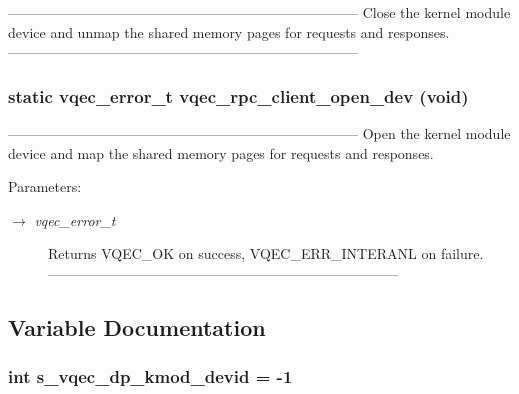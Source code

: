 --------------------------------------------------------------------------- Close the kernel module device and unmap the shared memory pages for requests and responses. --------------------------------------------------------------------------- 
\subsubsection{\setlength{\rightskip}{0pt plus 5cm}static vqec\_\-error\_\-t vqec\_\-rpc\_\-client\_\-open\_\-dev (void)\hspace{0.3cm}{\tt  [static]}}\label{vqec__rpc__client_8c_f24d2a8ab8e546935ab8c771964372e9}


--------------------------------------------------------------------------- Open the kernel module device and map the shared memory pages for requests and responses.

\begin{Desc}
\item[Parameters:]
\begin{description}
\item[\mbox{$\rightarrow$} {\em vqec\_\-error\_\-t}]Returns VQEC\_\-OK on success, VQEC\_\-ERR\_\-INTERANL on failure. --------------------------------------------------------------------------- \end{description}
\end{Desc}


\subsection{Variable Documentation}
\subsubsection{\setlength{\rightskip}{0pt plus 5cm}int \bf{s\_\-vqec\_\-dp\_\-kmod\_\-devid} = -1\hspace{0.3cm}{\tt  [static]}}\label{vqec__rpc__client_8c_bdeb1bab72cce1904b3b617af114b943}


